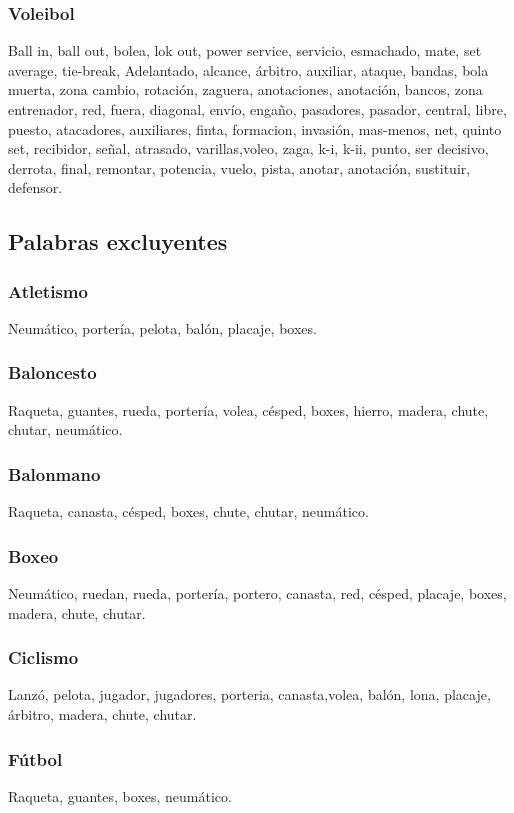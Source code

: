 \documentclass[../all.tex]{subfiles}
\begin{document}
    \subsubsection{Voleibol}
    Ball in, ball out, bolea, lok out, power service, servicio, esmachado, mate, set average, tie-break, Adelantado, alcance, árbitro, auxiliar, ataque, bandas, bola muerta, zona cambio, rotación, zaguera, anotaciones, anotación, bancos, zona entrenador, red, fuera, diagonal, envío, engaño, pasadores, pasador, central, libre, puesto, atacadores, auxiliares, finta, formacion, invasión, mas-menos, net, quinto set, recibidor, señal, atrasado, varillas,voleo, zaga, k-i, k-ii, punto, ser decisivo, derrota, final, remontar, potencia, vuelo, pista, anotar, anotación, sustituir, defensor.
\newpage
\subsection{Palabras excluyentes}
    \subsubsection{Atletismo}
    Neumático, portería, pelota, balón, placaje, boxes.
    \subsubsection{Baloncesto}
    Raqueta, guantes, rueda, portería, volea, césped, boxes, hierro, madera, chute, chutar, neumático.
    \subsubsection{Balonmano}
    Raqueta, canasta, césped, boxes, chute, chutar, neumático.
    \subsubsection{Boxeo}
    Neumático, ruedan, rueda, portería, portero, canasta, red, césped, placaje, boxes, madera, chute, chutar.
    \subsubsection{Ciclismo}
    Lanzó, pelota, jugador, jugadores, porteria, canasta,volea, balón, lona, placaje, árbitro, madera, chute, chutar.
    \subsubsection{Fútbol}
    Raqueta, guantes, boxes, neumático.
\end{document}
